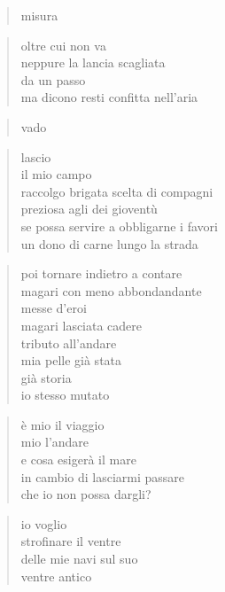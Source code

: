 	\begin{verse}
		misura
	\end{verse}

	\begin{verse}
		oltre cui non va\\
		neppure la lancia scagliata\\
		da un passo\\
		ma dicono resti confitta nell’aria
	\end{verse}

	\begin{verse}
		vado
	\end{verse}

	\begin{verse}
		lascio\\
		il mio campo\\
		raccolgo brigata scelta di compagni\\
		preziosa agli dei gioventù\\
		se possa servire a obbligarne i favori\\
		un dono di carne lungo la strada
	\end{verse}

	\begin{verse}
		poi tornare indietro a contare\\
		magari con meno abbondandante\\
		messe d’eroi\\
		magari lasciata cadere\\
		tributo all’andare\\
		mia pelle già stata\\
		già storia\\
		io stesso mutato
	\end{verse}

	\begin{verse}
		è mio il viaggio\\
		mio l’andare\\
		e cosa esigerà il mare\\
		in cambio di lasciarmi passare\\
		che io non possa dargli?
	\end{verse}

	\begin{verse}
		io voglio\\
		strofinare il ventre\\
		delle mie navi sul suo\\
		ventre antico
	\end{verse}

